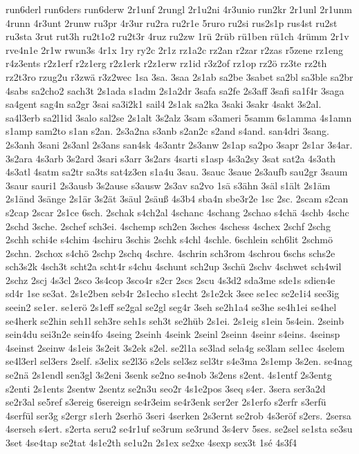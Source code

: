 {run6derl
run6ders
run6derw
2r1unf
2rungl
2r1u2ni
4r3unio
run2kr
2r1unl
2r1unm
4runn
4r3unt
2runw
ru3pr
4r3ur
ru2ra
ru2r1e
5ruro
ru2si
rus2s1p
rus4st
ru2st
ru3sta
3rut
rut3h
ru2t1o2
ru2t3r
4ruz
ru2zw
1rü
2rüb
rü1ben
rü1ch
4rümm
2r1v
rve4n1e
2r1w
rwun3s
4r1x
1ry
ry2c
2r1z
rz1a2c
rz2an
r2zar
r2zas
r5zene
rz1eng
r4z3ents
r2z1erf
r2z1erg
r2z1erk
r2z1erw
rz1id
r3z2of
rz1op
rz2ö
rz3te
rz2th
rz2t3ro
rzug2u
r3zwä
r3z2wec
1sa
3sa.
3saa
2s1ab
sa2be
3sabet
sa2bl
sa3ble
sa2br
4sabs
sa2cho2
sach3t
2s1ada
s1adm
2s1a2dr
3safa
sa2fe
2s3aff
3safi
sa1f4r
3saga
sa4gent
sag4n
sa2gr
3sai
sa3i2k1
sail4
2s1ak
sa2ka
3saki
3sakr
4sakt
3s2al.
sa4l3erb
sa2l1id
3salo
sal2se
2s1alt
3s2alz
3sam
s3ameri
5samm
6s1amma
4s1amn
s1amp
sam2to
s1an
s2an.
2s3a2na
s3anb
s2an2c
s2and
s4and.
san4dri
3sang.
2s3anh
3sani
2s3anl
2s3ans
san4sk
4s3antr
2s3anw
2s1ap
sa2po
3sapr
2s1ar
3s4ar.
3s2ara
4s3arb
3s2ard
3sari
s3arr
3s2ars
4sarti
s1asp
4s3a2sy
3sat
sat2a
4s3ath
4s3atl
4satm
sa2tr
sa3ts
sat4z3en
s1a4u
3sau.
3sauc
3saue
2s3aufb
sau2gr
3saum
3saur
sauri1
2s3ausb
3s2ause
s3ausw
2s3av
sa2vo
1sä
s3ähn
3säl
s1ält
2s1äm
2s1änd
3sänge
2s1är
3s2ät
3säul
2säuß
4s3b4
sba4n
sbe3r2e
1sc
2sc.
2scam
s2can
s2cap
2scar
2s1ce
6sch.
2schak
s4ch2al
4schanc
4schang
2schao
s4chä
4schb
4schc
2schd
3sche.
2schef
sch3ei.
4schemp
sch2en
3sches
4schess
4schex
2schf
2schg
2schh
schi4e
s4chim
4schiru
3schis
2schk
s4chl
4schle.
6schlein
sch6lit
2schmö
2schn.
2schox
s4chö
2schp
2schq
4schre.
4schrin
sch3rom
4schrou
6schs
schs2e
sch3s2k
4sch3t
scht2a
scht4r
s4chu
4schunt
sch2up
3schü
2schv
4schwet
sch4wil
2schz
2scj
4s3cl
2sco
3s4cop
3sco4r
s2cr
2scs
2scu
4s3d2
sda3me
sde1s
sdien4e
sd4r
1se
se3at.
2s1e2ben
seb4r
2s1echo
s1echt
2s1e2ck
3see
se1ec
se2e1i4
see3ig
seein2
se1er.
se1erö
2s1eff
se2gal
se2gl
seg4r
3seh
se2h1a4
se3he
se4h1ei
se4hel
se4herk
se2hin
seh1l
seh3re
seh1s
seh3t
se2hüb
2s1ei.
2s1eig
s1ein
5s4ein.
2seinb
sein4du
sei3n2e
sein4fo
4seing
2seinh
4seink
2seinl
2seinn
4seinr
s4eins.
4seinsp
4seinst
2seinw
4s1eis
3s2eit
3s2ek
s2el.
se2l1a
se3lad
sela4g
se3lam
sel1ec
4selem
se4l3erl
sel3ers
2self.
s3elix
se2l3ö
s2els
sel3sz
sel3tr
s4e3ma
2s1emp
3s2en.
se4nag
se2nä
2s1endl
sen3gl
3s2eni
3senk
se2no
se4nob
3s2ens
s2ent.
4s1entf
2s3entg
s2enti
2s1ents
2sentw
2sentz
se2n3u
seo2r
4s1e2pos
3seq
s4er.
3sera
ser3a2d
se2r3al
se5ref
s3ereig
6sereign
se4r3eim
se4r3enk
ser2er
2s1erfo
s2erfr
s3erfü
4serfül
ser3g
s2ergr
s1erh
2serhö
3seri
4serken
2s3ernt
se2rob
4s3eröf
s2ers.
2sersa
4serseh
s4ert.
s2erta
seru2
se4r1uf
se3rum
se3rund
3s4erv
5ses.
se2sel
se1sta
se3su
3set
4se4tap
se2tat
4s1e2th
se1u2n
2s1ex
se2xe
4sexp
sex3t
1sé
4s3f4
}
